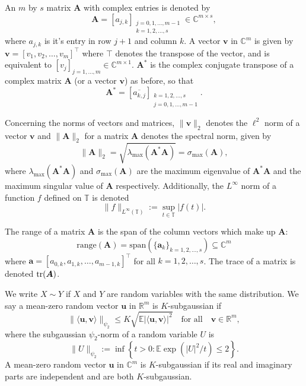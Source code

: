 \documentclass[11pt]{article}
\theoremstyle{definition}
\numberwithin{theorem}{section}
\numberwithin{equation}{section}
\def\C{\mathbb{C}}
\def\D{\mathbb{D}}
\def\E{\mathbb{E}}
\def\R{\mathbb{R}}
\def\S{\mathbb{S}}
\def\T{\mathbb{T}}
\renewcommand{\subset}{\subseteq}
\def\tr{{\rm tr}}
\newcommand{\bfa}{{\boldsymbol a}}
\newcommand{\bfu}{{\boldsymbol u}}
\newcommand{\bfv}{{\boldsymbol v}}
\newcommand{\bfA}{{\boldsymbol A}}
\def\forallspace{\quad\text{for all}\quad}
\numberwithin{equation}{section}
\begin{document}
An $m$ by $s$ matrix $\bfA$ with complex entries is denoted by 
$$\bfA = \left[ a_{j,k} \right]_{\substack{j=0,1,\dots,m-1 \\ k=1,2,\dots,s}} \in \C^{m\times s},$$ 
where $a_{j,k}$ is it's entry in row $j+1$ and column $k$. A vector $\bfv$ in $\C^m$ is given by $\bfv = \left[ v_1, v_2, \dots , v_m \right]^\top$ where $\top$ denotes the transpose of the vector, and is equivalent to $\left[ v_j \right]_{j=1,\dots,m } \in \C^{m\times 1}$. $\bfA^*$ is the complex conjugate transpose of a complex matrix $\bfA$ (or a vector $\bfv$) as before, so that 
$$\bfA^* = \left[ \overline{a_{k,j}} \right]_{\substack{k=1,2,\dots,s \\ j=0,1,\dots,m-1}}.$$ 

Concerning the norms of vectors and matrices, $\| \bfv \|_2$ denotes the $\ell^2$ norm of a vector $\bfv$ and $\| \bfA \|_2$ for a matrix $\bfA$ denotes the spectral norm, given by 
$$\| \bfA \|_2 = \sqrt{\lambda_{\max}(\bfA^*\bfA)} = \sigma_{\max}(\bfA),$$
where $\lambda_{\max}(\bfA^*\bfA)$ and $\sigma_{\max}(\bfA)$ are the maximum eigenvalue of $\bfA^*\bfA$ and the maximum singular value of $\bfA$ respectively. Additionally, the $L^{\infty}$ norm of a function $f$ defined on $\T$ is denoted 
$$\|f\|_{L^{\infty}(\T)} := \sup_{t\in\T} |f(t)|.$$

The range of a matrix $\bfA$ is the span of the column vectors which make up $\bfA$: 
$$
\text{range}(\bfA) = \text{span}(\{\bfa_k\}_{k=1,2,\dots,s})\subset \C^m 
$$
where $\bfa = \left[ a_{0,k}, a_{1,k}, \dots , a_{m-1,k} \right]^\top$ for all $k=1,2,\dots,s$. The trace of a matrix is denoted $\tr(\bfA)$. 


We write $X \sim Y$ if $X$ and $Y$ are random variables with the same distribution. We say a mean-zero random vector $\bfu$ in $\R^m$ is $K$-subgaussian if 
$$
\| \langle \bfu,\bfv\rangle\|_{\psi_2}
\leq K \sqrt{\E |\langle \bfu,\bfv\rangle|^2} \forallspace \bfv\in \R^m,
$$
where the subgaussian $\psi_2$-norm of a random variable $U$ is
$$
\|U\|_{\psi_2}
:= \inf \left\{ t>0 \colon \E \exp(|U|^2/t) \leq 2 \right\}.
$$
A mean-zero random vector $\bfu$ in $\C^m$ is $K$-subgaussian if its real and imaginary parts are independent and are both $K$-subgaussian.  
\end{document}
